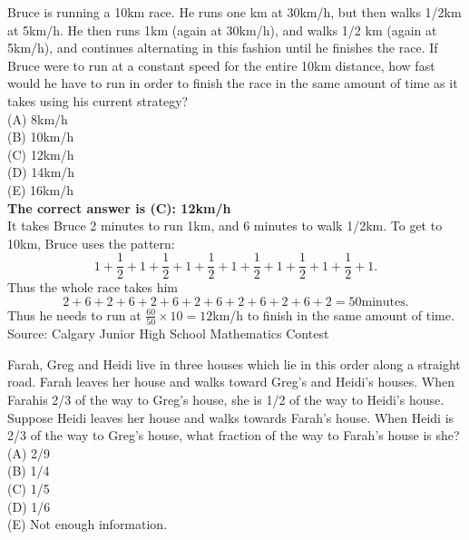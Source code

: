 \documentclass{article}
\begin{document}
\normalsize
Bruce is running a 10km race. He runs one km at 30km/h, but then walks 1/2km at 5km/h. He then runs 1km (again at 30km/h), and walks 1/2 km (again at 5km/h), and continues alternating in this fashion until he finishes the race. If Bruce were to run at a constant speed for the entire 10km distance, how fast would he have to run in order to finish the race in the same amount of time as it takes using his current strategy?\\
(A) 8km/h\\
(B) 10km/h\\
(C) 12km/h\\
(D) 14km/h\\
(E) 16km/h\\


\textbf{The correct answer is (C): 12km/h}\\[1 ex]
It takes Bruce 2 minutes to run 1km, and 6 minutes to walk 1/2km. To get to 10km, Bruce uses the pattern:
\begin{equation*}
1+\frac{1}{2}+1+\frac{1}{2}+1+\frac{1}{2}+1+\frac{1}{2}+1+\frac{1}{2}+1+\frac{1}{2}+1.
\end{equation*}
Thus the whole race takes him
\begin{equation*}
2+6+2+6+2+6+2+6+2+6+2+6+2=50\textrm{minutes}.
\end{equation*}
Thus he needs to run at $\frac{60}{50}\times10=12$km/h to finish in the same amount of time.
\\[5 ex]

\scriptsize
Source: Calgary Junior High School Mathematics Contest

\normalsize
Farah, Greg and Heidi live in three houses which lie in this order along a straight road. Farah leaves her house and walks toward Greg's and Heidi's houses. When Farahis 2/3 of the way to Greg's house, she is 1/2 of the way to Heidi's house. Suppose Heidi leaves her house and walks towards Farah's house. When Heidi is 2/3 of the way to Greg's house, what fraction of the way to Farah's house is she?\\
(A) 2/9\\
(B) 1/4\\
(C) 1/5\\
(D) 1/6\\
(E) Not enough information.\\
\end{document}
